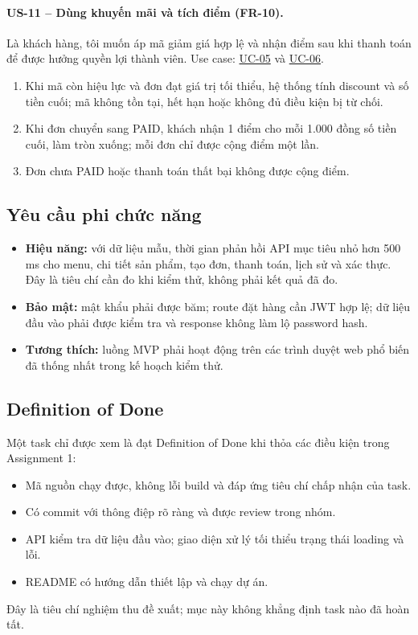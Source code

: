 \paragraph{US-11 -- Dùng khuyến mãi và tích điểm (FR-10).}
Là khách hàng, tôi muốn áp mã giảm giá hợp lệ và nhận điểm sau khi thanh toán để được hưởng quyền lợi thành viên. Use case: \hyperref[uc05]{UC-05} và \hyperref[uc06]{UC-06}.
\begin{enumerate}[label=\textbf{AC\arabic*:},leftmargin=*]
  \item Khi mã còn hiệu lực và đơn đạt giá trị tối thiểu, hệ thống tính discount và số tiền cuối; mã không tồn tại, hết hạn hoặc không đủ điều kiện bị từ chối.
  \item Khi đơn chuyển sang PAID, khách nhận 1 điểm cho mỗi 1.000 đồng số tiền cuối, làm tròn xuống; mỗi đơn chỉ được cộng điểm một lần.
  \item Đơn chưa PAID hoặc thanh toán thất bại không được cộng điểm.
\end{enumerate}

\subsection{Yêu cầu phi chức năng}
\begin{itemize}[leftmargin=*]
  \item \textbf{Hiệu năng:} với dữ liệu mẫu, thời gian phản hồi API mục tiêu nhỏ hơn 500 ms cho menu, chi tiết sản phẩm, tạo đơn, thanh toán, lịch sử và xác thực. Đây là tiêu chí cần đo khi kiểm thử, không phải kết quả đã đo.
  \item \textbf{Bảo mật:} mật khẩu phải được băm; route đặt hàng cần JWT hợp lệ; dữ liệu đầu vào phải được kiểm tra và response không làm lộ password hash.
  \item \textbf{Tương thích:} luồng MVP phải hoạt động trên các trình duyệt web phổ biến đã thống nhất trong kế hoạch kiểm thử.
\end{itemize}

\subsection{Definition of Done}
Một task chỉ được xem là đạt Definition of Done khi thỏa các điều kiện trong Assignment 1:
\begin{itemize}[leftmargin=*]
  \item Mã nguồn chạy được, không lỗi build và đáp ứng tiêu chí chấp nhận của task.
  \item Có commit với thông điệp rõ ràng và được review trong nhóm.
  \item API kiểm tra dữ liệu đầu vào; giao diện xử lý tối thiểu trạng thái loading và lỗi.
  \item README có hướng dẫn thiết lập và chạy dự án.
\end{itemize}
Đây là tiêu chí nghiệm thu đề xuất; mục này không khẳng định task nào đã hoàn tất.

